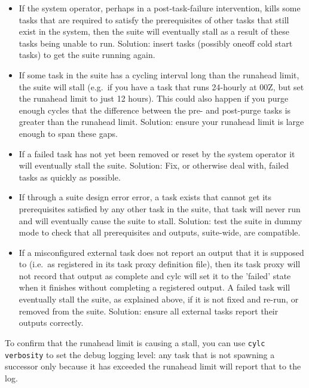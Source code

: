 \documentclass[11pt,a4paper]{article}
\begin{document}
\begin{itemize}
    \item If the system operator, perhaps in a post-task-failure
    intervention, kills some tasks that are required to satisfy the
    prerequisites of other tasks that still exist in the system, then 
    the suite will eventually stall as a result of these tasks being
    unable to run. Solution: insert tasks (possibly oneoff cold start
    tasks) to get the suite running again.

    \item If some task in the suite has a cycling interval long than
        the runahead limit, the suite will stall (e.g.\ if
    you have a task that runs 24-hourly at 00Z, but set the runahead
    limit to just 12 hours). This could also happen if you purge enough
    cycles that the difference between the pre- and post-purge tasks
    is greater than the runahead limit. Solution: ensure your runahead
    limit is large enough to span these gaps.

    \item If a failed task has not yet been removed or reset by the
    system operator it will eventually stall the suite. Solution:
    Fix, or otherwise deal with, failed tasks as quickly as possible.

    \item If through a suite design error error, a task exists that
        cannot get its prerequisites satisfied by any other task in the
        suite, that task will never run and will eventually cause the
        suite to stall.  Solution: test the suite in dummy mode to 
        check that all prerequisites and outputs, suite-wide, are 
        compatible.

    \item If a misconfigured external task does not report an output
        that it is supposed to (i.e.\ as registered in its task proxy
        definition file), then its task proxy will not record that 
        output as complete and cylc will set it to the 'failed' state
        when it finishes without completing a registered output. A
        failed task will eventually stall the suite, as explained above, 
        if it is not fixed and re-run, or removed from the suite.
        Solution: ensure all external tasks report their outputs
        correctly.

\end{itemize}

To confirm that the runahead limit is causing a stall, you can use 
\lstinline=cylc verbosity= to set the debug logging level: any task
that is not spawning a successor only because it has exceeded the
runahead limit will report that to the log.
\end{document}
